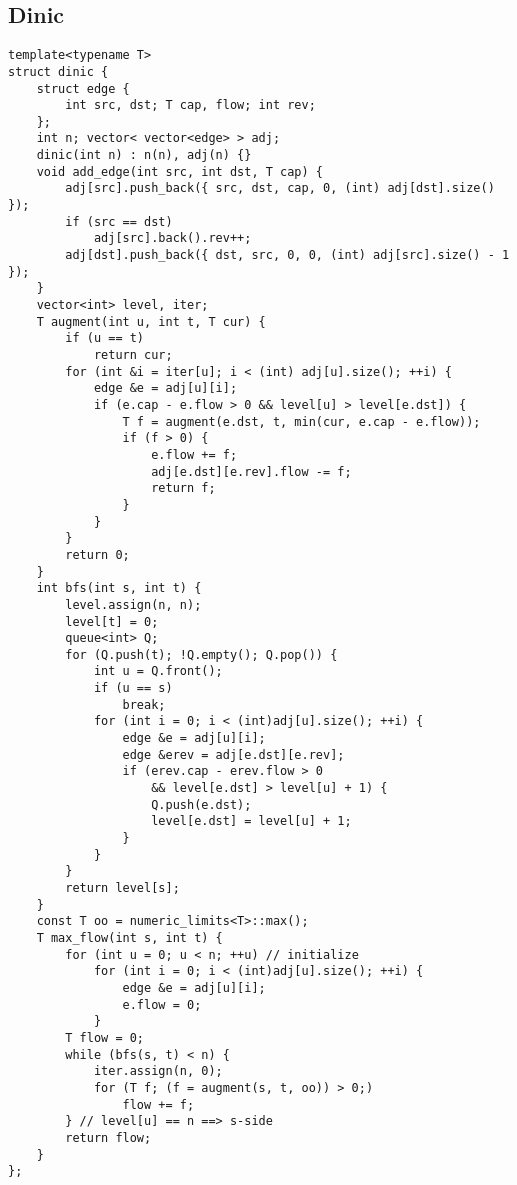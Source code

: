 \documentclass[landscape, 8pt, a4paper, oneside]{extarticle}
\begin{document}
\begin{multicols}{3}
\subsection{Dinic}
\begin{verbatim}
template<typename T>
struct dinic {
    struct edge {
        int src, dst; T cap, flow; int rev;
    };
    int n; vector< vector<edge> > adj;
    dinic(int n) : n(n), adj(n) {}
    void add_edge(int src, int dst, T cap) {
        adj[src].push_back({ src, dst, cap, 0, (int) adj[dst].size() });
        if (src == dst)
            adj[src].back().rev++;
        adj[dst].push_back({ dst, src, 0, 0, (int) adj[src].size() - 1 });
    }
    vector<int> level, iter;
    T augment(int u, int t, T cur) {
        if (u == t)
            return cur;
        for (int &i = iter[u]; i < (int) adj[u].size(); ++i) {
            edge &e = adj[u][i];
            if (e.cap - e.flow > 0 && level[u] > level[e.dst]) {
                T f = augment(e.dst, t, min(cur, e.cap - e.flow));
                if (f > 0) {
                    e.flow += f;
                    adj[e.dst][e.rev].flow -= f;
                    return f;
                }
            }
        }
        return 0;
    }
    int bfs(int s, int t) {
        level.assign(n, n);
        level[t] = 0;
        queue<int> Q;
        for (Q.push(t); !Q.empty(); Q.pop()) {
            int u = Q.front();
            if (u == s)
                break;
            for (int i = 0; i < (int)adj[u].size(); ++i) {
                edge &e = adj[u][i];
                edge &erev = adj[e.dst][e.rev];
                if (erev.cap - erev.flow > 0
                    && level[e.dst] > level[u] + 1) {
                    Q.push(e.dst);
                    level[e.dst] = level[u] + 1;
                }
            }
        }
        return level[s];
    }
    const T oo = numeric_limits<T>::max();
    T max_flow(int s, int t) {
        for (int u = 0; u < n; ++u) // initialize
            for (int i = 0; i < (int)adj[u].size(); ++i) {
                edge &e = adj[u][i];
                e.flow = 0;
            }
        T flow = 0;
        while (bfs(s, t) < n) {
            iter.assign(n, 0);
            for (T f; (f = augment(s, t, oo)) > 0;)
                flow += f;
        } // level[u] == n ==> s-side
        return flow;
    }
};
\end{verbatim}

\end{multicols}
\end{document}
